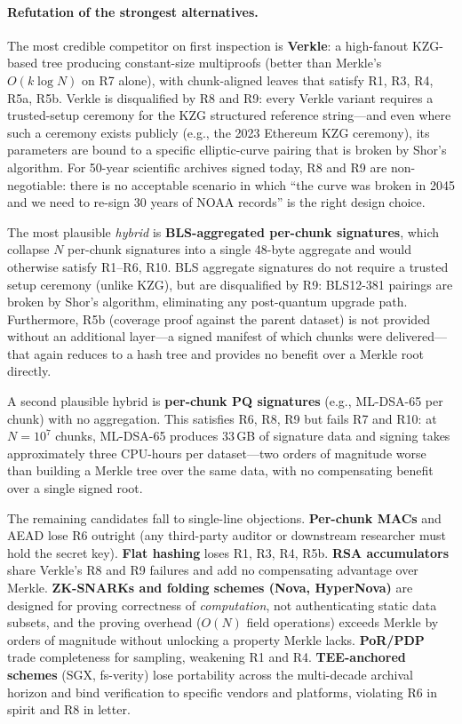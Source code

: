 \documentclass[11pt]{article}
\begin{document}
\paragraph{Refutation of the strongest alternatives.}
The most credible competitor on first inspection is \textbf{Verkle}: a
high-fanout KZG-based tree producing constant-size multiproofs (better than
Merkle's $O(k\log N)$ on R7 alone), with chunk-aligned leaves that satisfy
R1, R3, R4, R5a, R5b. Verkle is disqualified by R8 and R9: every Verkle
variant requires a trusted-setup ceremony for the KZG structured reference
string---and even where such a ceremony exists publicly (e.g., the 2023
Ethereum KZG ceremony), its parameters are bound to a specific
elliptic-curve pairing that is broken by Shor's algorithm. For 50-year
scientific archives signed today, R8 and R9 are non-negotiable: there is no
acceptable scenario in which ``the curve was broken in 2045 and we need to
re-sign 30 years of NOAA records'' is the right design choice.

The most plausible \emph{hybrid} is \textbf{BLS-aggregated per-chunk
signatures}, which collapse $N$ per-chunk signatures into a single 48-byte
aggregate and would otherwise satisfy R1--R6, R10. BLS aggregate signatures
do not require a trusted setup ceremony (unlike KZG), but are disqualified by
R9: BLS12-381 pairings are broken by Shor's algorithm, eliminating any
post-quantum upgrade path. Furthermore, R5b (coverage proof against the
parent dataset) is not provided without an additional layer---a signed manifest
of which chunks were delivered---that again reduces to a hash tree and provides
no benefit over a Merkle root directly.

A second plausible hybrid is \textbf{per-chunk PQ signatures} (e.g.,
ML-DSA-65 per chunk) with no aggregation. This satisfies R6, R8, R9 but
fails R7 and R10: at $N=10^7$ chunks, ML-DSA-65 produces 33\,GB of signature
data and signing takes approximately three CPU-hours per dataset---two
orders of magnitude worse than building a Merkle tree over the same data,
with no compensating benefit over a single signed root.

The remaining candidates fall to single-line objections. \textbf{Per-chunk
MACs} and AEAD lose R6 outright (any third-party auditor or downstream
researcher must hold the secret key). \textbf{Flat hashing} loses R1, R3,
R4, R5b. \textbf{RSA accumulators} share Verkle's R8 and R9 failures and
add no compensating advantage over Merkle. \textbf{ZK-SNARKs and folding
schemes (Nova, HyperNova)} are designed for proving correctness of
\emph{computation}, not authenticating static data subsets, and the proving
overhead ($O(N)$ field operations) exceeds Merkle by orders of magnitude
without unlocking a property Merkle lacks. \textbf{PoR/PDP} trade
completeness for sampling, weakening R1 and R4. \textbf{TEE-anchored
schemes} (SGX, fs-verity) lose portability across the multi-decade archival
horizon and bind verification to specific vendors and platforms, violating
R6 in spirit and R8 in letter.
\end{document}
